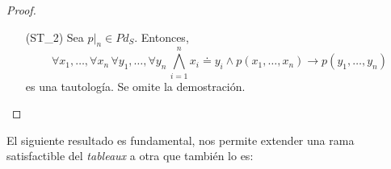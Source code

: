 \begin{proof}
\begin{itemize}

        \item[(ST_{2})] Sea $p|_n \in Pd_S$. Entonces, $$\forall x_1, \dots, \forall x_n \, \forall y_1, \dots, \forall y_n \, \bigwedge\limits_{i = 1}^{n} x_i \doteq y_i \land  p(x_1, \dots, x_n) \rightarrow p(y_1, \dots, y_n)$$ es una tautología. Se omite la demostración.
\end{itemize}
\end{proof}

El siguiente resultado es fundamental, nos permite extender una rama satisfactible del \textit{tableaux} a otra que también lo es:

